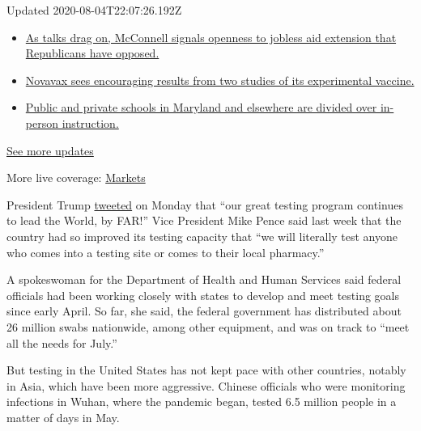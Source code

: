 Updated 2020-08-04T22:07:26.192Z

\begin{itemize}
\tightlist
\item
  \href{https://www.nytimes3xbfgragh.onion/2020/08/04/world/coronavirus-cases.html?action=click\&pgtype=Article\&state=default\&region=MAIN_CONTENT_1\&context=storylines_live_updates\#link-2daa96b5}{As
  talks drag on, McConnell signals openness to jobless aid extension
  that Republicans have opposed.}
\item
  \href{https://www.nytimes3xbfgragh.onion/2020/08/04/world/coronavirus-cases.html?action=click\&pgtype=Article\&state=default\&region=MAIN_CONTENT_1\&context=storylines_live_updates\#link-1228a480}{Novavax
  sees encouraging results from two studies of its experimental
  vaccine.}
\item
  \href{https://www.nytimes3xbfgragh.onion/2020/08/04/world/coronavirus-cases.html?action=click\&pgtype=Article\&state=default\&region=MAIN_CONTENT_1\&context=storylines_live_updates\#link-4825b93}{Public
  and private schools in Maryland and elsewhere are divided over
  in-person instruction.}
\end{itemize}

\href{https://www.nytimes3xbfgragh.onion/2020/08/04/world/coronavirus-cases.html?action=click\&pgtype=Article\&state=default\&region=MAIN_CONTENT_1\&context=storylines_live_updates}{See
more updates}

More live coverage:
\href{https://www.nytimes3xbfgragh.onion/live/2020/08/04/business/stock-market-today-coronavirus?action=click\&pgtype=Article\&state=default\&region=MAIN_CONTENT_1\&context=storylines_live_updates}{Markets}

President Trump
\href{https://twitter.com/realDonaldTrump/status/1280205902742781958?s=20}{tweeted}
on Monday that ``our great testing program continues to lead the World,
by FAR!'' Vice President Mike Pence said last week that the country had
so improved its testing capacity that ``we will literally test anyone
who comes into a testing site or comes to their local pharmacy.''

A spokeswoman for the Department of Health and Human Services said
federal officials had been working closely with states to develop and
meet testing goals since early April. So far, she said, the federal
government has distributed about 26 million swabs nationwide, among
other equipment, and was on track to ``meet all the needs for July.''

But testing in the United States has not kept pace with other countries,
notably in Asia, which have been more aggressive. Chinese officials who
were monitoring infections in Wuhan, where the pandemic began, tested
6.5 million people in a matter of days in May.

